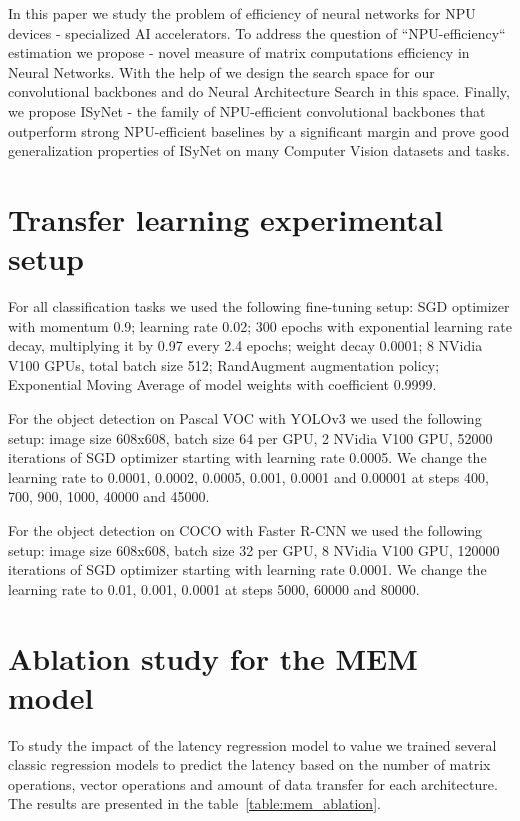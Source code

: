 \documentclass[letterpaper]{article}
\begin{document}
In this paper we study the problem of efficiency of neural networks for NPU devices - specialized AI accelerators.
To address the question of ``NPU-efficiency`` estimation we propose  - novel measure of matrix computations efficiency in Neural Networks.
With the help of  we design the search space for our convolutional backbones and do Neural Architecture Search in this space.
Finally, we propose ISyNet - the family of NPU-efficient convolutional backbones that outperform strong NPU-efficient baselines by a significant margin and prove good generalization properties of ISyNet on many Computer Vision datasets and tasks.

\clearpage



\clearpage

\appendix

\section{Transfer learning experimental setup}

For all classification tasks we used the following fine-tuning setup: SGD optimizer with momentum 0.9; learning rate 0.02; 300 epochs with exponential learning rate decay, multiplying it by 0.97 every 2.4 epochs; weight decay 0.0001; 8 NVidia V100 GPUs, total batch size 512; RandAugment augmentation policy; Exponential Moving Average of model weights with coefficient 0.9999.

For the object detection on Pascal VOC with YOLOv3 we used the following setup: image size 608x608, batch size 64 per GPU, 2 NVidia V100 GPU, 52000 iterations of SGD optimizer starting with learning rate 0.0005. We change the learning rate to 0.0001, 0.0002, 0.0005, 0.001, 0.0001 and 0.00001 at steps 400, 700, 900, 1000, 40000 and 45000.

For the object detection on COCO with Faster R-CNN we used the following setup: image size 608x608, batch size 32 per GPU, 8 NVidia V100 GPU, 120000 iterations of SGD optimizer starting with learning rate 0.0001. We change the learning rate to 0.01, 0.001, 0.0001 at steps 5000, 60000 and 80000.

\section{Ablation study for the MEM model}

To study the impact of the latency regression model to  value we trained several classic regression models to predict the latency based on the number of matrix operations, vector operations and amount of data transfer for each architecture. The results are presented in the table~\ref{table:mem_ablation}. 
\end{document}

